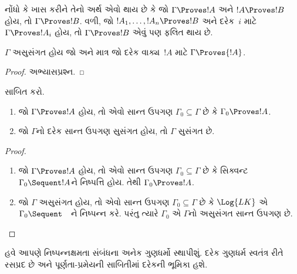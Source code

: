 નોંધો કે ખાસ કરીને તેનો અર્થ એવો થાય છે કે જો $\Gamma \Proves !A$ અને
$!A \Proves !B$ હોય, તો $\Gamma \Proves !B$. વળી, જો
$!A_1, \dots, !A_n \Proves !B$ અને દરેક~$i$ માટે
$\Gamma \Proves !A_i$ હોય, તો $\Gamma \Proves !B$ એવું પણ ફલિત થાય છે.

\begin{prop}
$\Gamma$ અસુસંગત હોય જો અને માત્ર જો દરેક વાક્ય~$!A$ માટે
$\Gamma \Proves {!A}$.
\end{prop}

\begin{proof}
અભ્યાસપ્રશ્ન.
\end{proof}

\begin{prob}
 સાબિત કરો.
\end{prob}

\begin{prop}[સઘનતા]
  \begin{enumerate}
  \item જો $\Gamma \Proves !A$ હોય, તો એવો સાન્ત ઉપગણ
    $\Gamma_0 \subseteq \Gamma$ છે કે $\Gamma_0 \Proves !A$.
  \item જો $\Gamma$નો દરેક સાન્ત ઉપગણ સુસંગત હોય, તો $\Gamma$ સુસંગત છે.
  \end{enumerate}
\end{prop}

\begin{proof}
  \begin{enumerate}
    \item જો $\Gamma \Proves !A$ હોય, તો એવો સાન્ત ઉપગણ
      $\Gamma_0 \subseteq \Gamma$ છે કે સિક્વન્ટ
      $\Gamma_0 \Sequent !A$ને નિષ્પત્તિ હોય. તેથી
      $\Gamma_0 \Proves !A$.
    \item જો $\Gamma$ અસુસંગત હોય, તો એવો સાન્ત ઉપગણ
      $\Gamma_0 \subseteq \Gamma$ છે કે $\Log{LK}$ એ
      $\Gamma_0 \Sequent \quad$ને નિષ્પન્ન કરે. પરંતુ ત્યારે
      $\Gamma_0$ એ $\Gamma$નો અસુસંગત સાન્ત ઉપગણ છે.
  \end{enumerate}
\end{proof}
\endgroup


\begingroup
\makeatletter{}\makeatother


\label{guunit:OLP-0078}


હવે આપણે નિષ્પન્નક્ષમતા સંબંધના અનેક ગુણધર્મો સ્થાપીશું. દરેક
ગુણધર્મ સ્વતંત્ર રીતે રસપ્રદ છે અને પૂર્ણતા-પ્રમેયની સાબિતીમાં દરેકની
ભૂમિકા હશે.

